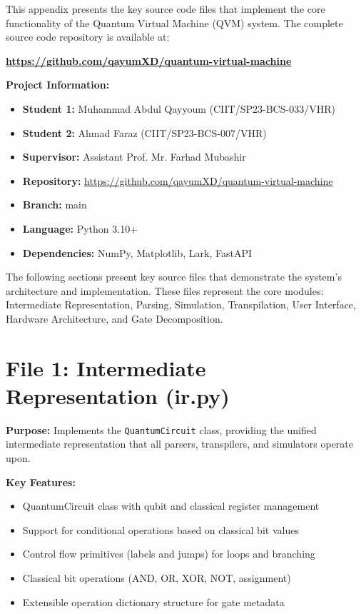 
This appendix presents the key source code files that implement the core functionality of the Quantum Virtual Machine (QVM) system. The complete source code repository is available at:

\begin{center}
\textbf{\url{https://github.com/qayumXD/quantum-virtual-machine}}
\end{center}

\vspace{0.5cm}

\textbf{Project Information:}
\begin{itemize}
\item \textbf{Student 1:} Muhammad Abdul Qayyoum (CIIT/SP23-BCS-033/VHR)
\item \textbf{Student 2:} Ahmad Faraz (CIIT/SP23-BCS-007/VHR)
\item \textbf{Supervisor:} Assistant Prof. Mr. Farhad Mubashir
\item \textbf{Repository:} \url{https://github.com/qayumXD/quantum-virtual-machine}
\item \textbf{Branch:} main
\item \textbf{Language:} Python 3.10+
\item \textbf{Dependencies:} NumPy, Matplotlib, Lark, FastAPI
\end{itemize}

\vspace{0.5cm}

The following sections present key source files that demonstrate the system's architecture and implementation. These files represent the core modules: Intermediate Representation, Parsing, Simulation, Transpilation, User Interface, Hardware Architecture, and Gate Decomposition.

\clearpage

\section{File 1: Intermediate Representation (ir.py)}

\textbf{Purpose:} Implements the \texttt{QuantumCircuit} class, providing the unified intermediate representation that all parsers, transpilers, and simulators operate upon.

\textbf{Key Features:}
\begin{itemize}
\item QuantumCircuit class with qubit and classical register management
\item Support for conditional operations based on classical bit values
\item Control flow primitives (labels and jumps) for loops and branching
\item Classical bit operations (AND, OR, XOR, NOT, assignment)
\item Extensible operation dictionary structure for gate metadata
\end{itemize}

